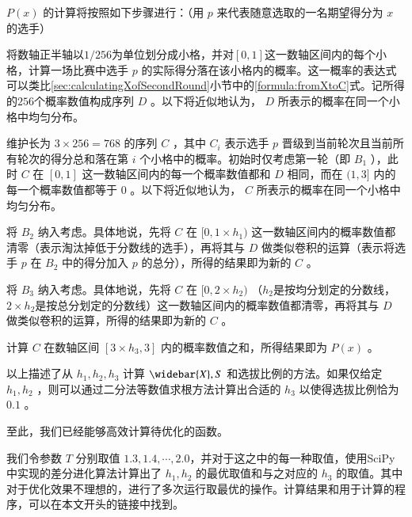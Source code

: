         $P(x)$ 的计算将按照如下步骤进行：（用 $p$ 来代表随意选取的一名期望得分为 $x$ 的选手）
        \begin{asparaenum}[\bfseries{步骤} 1.]
            \item 将数轴正半轴以$1/256$为单位划分成小格，并对$[0,1]$这一数轴区间内的每个小格，计算一场比赛中选手 $p$ 的实际得分落在该小格内的概率。这一概率的表达式可以类比\ref{sec:calculatingXofSecondRound}小节中的\eqref{formula:fromXtoC}式。记所得的$256$个概率数值构成序列 $D$ 。以下将近似地认为， $D$ 所表示的概率在同一个小格中均匀分布。
            \item 维护长为 $3\times256=768$ 的序列 $C$ ，其中 $C_i$ 表示选手 $p$ 晋级到当前轮次且当前所有轮次的得分总和落在第 $i$ 个小格中的概率。初始时仅考虑第一轮（即 $B_1$ ），此时 $C$ 在 $[0,1]$ 这一数轴区间内的每一个概率数值都和 $D$ 相同，而在 $(1,3]$ 内的每一个概率数值都等于 $0$ 。以下将近似地认为， $C$ 所表示的概率在同一个小格中均匀分布。
            \item 将 $B_2$ 纳入考虑。具体地说，先将 $C$ 在 $[0,1\times h_1)$ 这一数轴区间内的概率数值都清零（表示淘汰掉低于分数线的选手），再将其与 $D$ 做类似卷积的运算（表示将选手 $p$ 在 $B_2$ 中的得分加入 $p$ 的总分），所得的结果即为新的 $C$ 。
            \item 将 $B_3$ 纳入考虑。具体地说，先将 $C$ 在 $[0,2\times h_2)$ （$h_2$是按均分划定的分数线，$2\times h_2$是按总分划定的分数线）这一数轴区间内的概率数值都清零，再将其与 $D$ 做类似卷积的运算，所得的结果即为新的 $C$ 。
            \item 计算 $C$ 在数轴区间 $[3\times h_3,3]$ 内的概率数值之和，所得结果即为 $P(x)$ 。
        \end{asparaenum}

        \vspace{1.5ex}

        以上描述了从 $h_1,h_2,h_3$ 计算 $\widebar{X},S$ 和选拔比例的方法。如果仅给定 $h_1,h_2$ ，则可以通过二分法等数值求根方法计算出合适的 $h_3$ 以使得选拔比例恰为 $0.1$ 。
        
        至此，我们已经能够高效计算待优化的函数。

        \vspace{1.5ex}

        我们令参数 $T$ 分别取值 $1.3,1.4,\cdots,2.0$，并对于这之中的每一种取值，使用SciPy中实现的差分进化算法\cite{scipy_de}计算出了 $h_1,h_2$ 的最优取值和与之对应的 $h_3$ 的取值。其中对于优化效果不理想的，进行了多次运行取最优的操作。计算结果和用于计算的程序，可以在本文开头的链接中找到。

